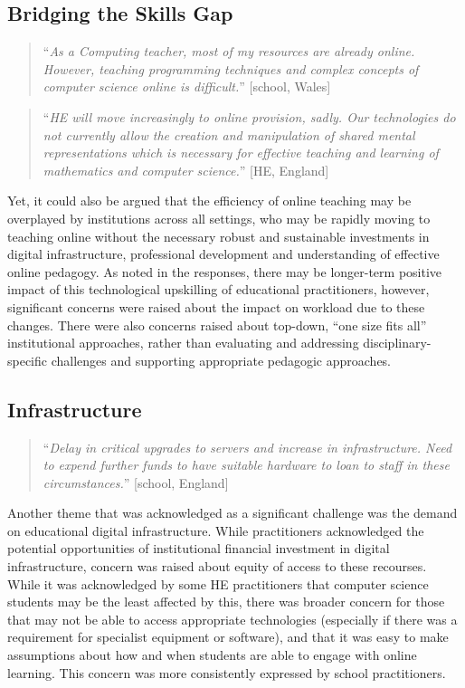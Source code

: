 \documentclass[conference]{IEEEtran}
\begin{document}
\subsection{Bridging the Skills Gap}

\begin{quotation}
``{\emph{As a Computing teacher, most of my resources are already
online. However, teaching programming techniques and complex concepts
of computer science online is difficult.}}'' [school, Wales]
\end{quotation}

\begin{quotation}
``{\emph{HE will move increasingly to online provision, sadly. Our
technologies do not currently allow the creation and manipulation of
shared mental representations which is necessary for effective
teaching and learning of mathematics and computer science.}}'' [HE, England]
\end{quotation}

Yet, it could also be argued that the efficiency of online teaching
may be overplayed by institutions across all settings, who may be
rapidly moving to teaching online without the necessary robust and
sustainable investments in digital infrastructure, professional
development and understanding of effective online pedagogy. As noted
in the responses, there may be longer-term positive impact of this
technological upskilling of educational practitioners, however,
significant concerns were raised about the impact on workload due to
these changes. There were also concerns raised about top-down, ``one
size fits all'' institutional approaches, rather than evaluating and
addressing disciplinary-specific challenges and supporting appropriate
pedagogic approaches.

\subsection{Infrastructure}

\begin{quotation}
``{\emph{Delay in critical upgrades to servers and increase in
infrastructure.  Need to expend further funds to have suitable
hardware to loan to staff in these circumstances.}}'' [school, England]
\end{quotation}

Another theme that was acknowledged as a significant challenge was the
demand on educational digital infrastructure. While practitioners
acknowledged the potential opportunities of institutional financial
investment in digital infrastructure, concern was raised about equity
of access to these recourses. While it was acknowledged by some HE
practitioners that computer science students may be the least affected
by this, there was broader concern for those that may not be able to
access appropriate technologies (especially if there was a requirement
for specialist equipment or software), and that it was easy to make
assumptions about how and when students are able to engage with online
learning. This concern was more consistently expressed by school
practitioners.
\end{document}
